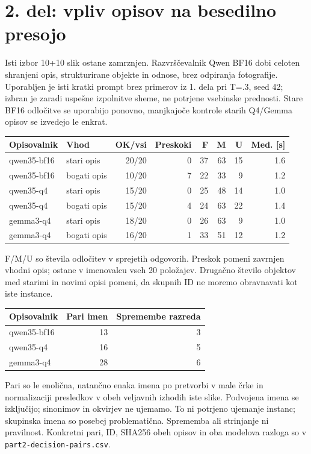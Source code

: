 \section*{2. del: vpliv opisov na besedilno presojo}
Isti izbor 10+10 slik ostane zamrznjen. Razvrščevalnik Qwen BF16 dobi celoten shranjeni opis, strukturirane objekte in odnose, brez odpiranja fotografije. Uporabljen je isti kratki prompt brez primerov iz 1. dela pri T=.3, seed 42; izbran je zaradi uspešne izpolnitve sheme, ne potrjene vsebinske prednosti. Stare BF16 odločitve se uporabijo ponovno, manjkajoče kontrole starih Q4/Gemma opisov se izvedejo le enkrat.
\begin{center}\small\begin{tabular}{llrrrrrr}\toprule
Opisovalnik & Vhod & OK/vsi & Preskoki & F & M & U & Med. [s] \\ \midrule
qwen35-bf16 & stari opis & 20/20 & 0 & 37 & 63 & 15 & 1.6 \\
qwen35-bf16 & bogati opis & 10/20 & 7 & 22 & 33 & 9 & 1.2 \\
qwen35-q4 & stari opis & 15/20 & 0 & 25 & 48 & 14 & 1.0 \\
qwen35-q4 & bogati opis & 15/20 & 4 & 24 & 63 & 22 & 1.4 \\
gemma3-q4 & stari opis & 18/20 & 0 & 26 & 63 & 9 & 1.0 \\
gemma3-q4 & bogati opis & 16/20 & 1 & 33 & 51 & 12 & 1.2 \\
\bottomrule\end{tabular}\end{center}

F/M/U so števila odločitev v sprejetih odgovorih. Preskok pomeni zavrnjen vhodni opis; ostane v imenovalcu vseh 20 položajev. Drugačno število objektov med starimi in novimi opisi pomeni, da skupnih ID ne moremo obravnavati kot iste instance.
\begin{center}\small\begin{tabular}{lrr}\toprule
Opisovalnik & Pari imen & Spremembe razreda \\ \midrule
qwen35-bf16 & 13 & 3 \\
qwen35-q4 & 16 & 5 \\
gemma3-q4 & 28 & 6 \\
\bottomrule\end{tabular}\end{center}

Pari so le enolična, natančno enaka imena po pretvorbi v male črke in normalizaciji presledkov v obeh veljavnih izhodih iste slike. Podvojena imena se izključijo; sinonimov in okvirjev ne ujemamo. To ni potrjeno ujemanje instanc; skupinska imena so posebej problematična. Sprememba ali strinjanje ni pravilnost. Konkretni pari, ID, SHA256 obeh opisov in oba modelova razloga so v \texttt{part2-decision-pairs.csv}.
